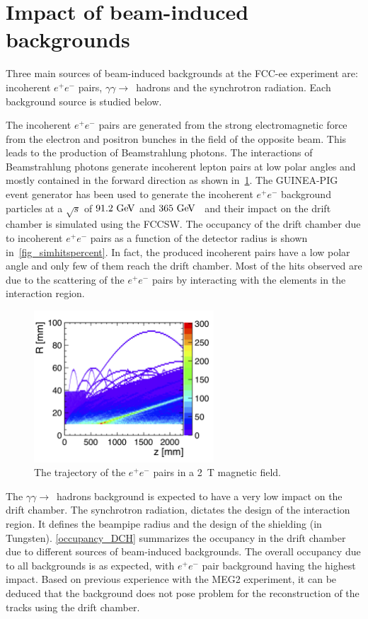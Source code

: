 \section{Impact of beam-induced backgrounds}
Three main sources of beam-induced backgrounds at the FCC-ee experiment are: incoherent $e^+e^-$ pairs, $\gamma\gamma\rightarrow$~hadrons and the synchrotron radiation. Each background source is studied below.

The incoherent $e^+e^-$ pairs are generated from the strong electromagnetic force from the electron and positron bunches in the field of the opposite beam. This leads to the production of Beamstrahlung photons. The interactions of Beamstrahlung photons generate incoherent lepton pairs at low polar angles and mostly contained in the forward direction as shown in~\cref{fig_pairbcg}. The \textsc{GUINEA-PIG}~\cite{Schulte:382453} event generator has been used to generate the incoherent $e^+e^-$ background particles at a $\sqrt{s}$ of $91.2\,\mathrm{\,Ge\kern -0.1em V}$ and $365\,\mathrm{\,Ge\kern -0.1em V}$~\cite{Voutsinas:2017eca} and their impact on the drift chamber is simulated using the FCCSW. The occupancy of the drift chamber due to incoherent $e^+e^-$ pairs as a function of the detector radius is shown in~\cref{fig_simhitspercent}. In fact, the produced incoherent pairs have a low polar angle and only few of them reach the drift chamber. Most of the hits observed are due to the scattering of the $e^+e^-$ pairs by interacting with the elements in the interaction region.


\begin{figure}[ht]
\centering
\includegraphics[width=0.6\textwidth]{figures/pairs_R_Z.png}
\caption{The trajectory of the $e^+e^-$ pairs in a 2~T magnetic field.}
\label{fig_pairbcg}
\end{figure}



The $\gamma\gamma\rightarrow$~hadrons background is expected to have a very low impact on the drift chamber. The synchrotron radiation, dictates the design of the interaction region. It defines the beampipe radius and the design of the shielding (in Tungsten).
\cref{occupancy_DCH} summarizes the occupancy in the drift chamber due to different sources of beam-induced backgrounds. The overall occupancy due to all backgrounds is as expected, with $e^+e^-$ pair background having the highest impact. Based on previous experience with the MEG2 experiment, it can be deduced that the background does not pose problem for the reconstruction of the tracks using the drift chamber.

